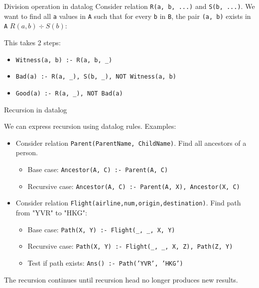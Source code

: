 \begin{theorem}
    {Division operation in datalog}
    Consider relation \texttt{R(a, b, ...)} and \texttt{S(b, ...)}. We want to find all \texttt{a} values in \texttt{A} such that for every \texttt{b} in \texttt{B}, the pair \texttt{(a, b)} exists in \texttt{A} $R(a, b) \div S(b)$:

    This takes 2 steps:
    \begin{itemize}
        \item \texttt{Witness(a, b) :- R(a, b, \_)}
        \item \texttt{Bad(a) :- R(a, \_), S(b, \_), NOT Witness(a, b)}
        \item \texttt{Good(a) :- R(a, \_), NOT Bad(a)}
    \end{itemize}
\end{theorem}

\begin{theorem}
    {Recursion in datalog}

    We can express recursion using datalog rules. Examples:

    \begin{itemize}
        \item Consider relation \texttt{Parent(ParentName, ChildName)}. Find all ancestors of a person.
              \begin{itemize}
                  \item Base case: \texttt{Ancestor(A, C) :- Parent(A, C)}
                  \item Recursive case: \texttt{Ancestor(A, C) :- Parent(A, X), Ancestor(X, C)}
              \end{itemize}
        \item Consider relation \texttt{Flight(airline,num,origin,destination)}. Find path from "YVR" to "HKG":
              \begin{itemize}
                  \item Base case: \texttt{Path(X, Y) :- Flight(\_, \_, X, Y)}
                  \item Recursive case: \texttt{Path(X, Y) :- Flight(\_, \_, X, Z), Path(Z, Y)}
                  \item Test if path exists: \texttt{Ans() :- Path('YVR', 'HKG')}
              \end{itemize}
    \end{itemize}

    The recursion continues until recursion head no longer produces new results.
\end{theorem}